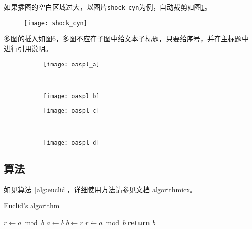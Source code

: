 如果插图的空白区域过大，以图片\verb|shock_cyn|为例，自动裁剪如图\ref{fig:shock_cyn}。
\begin{figure}[!htbp]
    \centering
    \texttt{[image: shock\_cyn]}
    \label{fig:shock_cyn}
\end{figure}

多图的插入如图\ref{fig:oaspl}，多图不应在子图中给文本子标题，只要给序号，并在主标题中进行引用说明。
\begin{figure}[!htbp]
    \centering
    \begin{subfigure}[b]{0.35\textwidth}
      \texttt{[image: oaspl\_a]}
      \caption{}
      \label{fig:oaspl_a}
    \end{subfigure}%
    ~%
    \begin{subfigure}[b]{0.35\textwidth}
      \texttt{[image: oaspl\_b]}
      \caption{}
      \label{fig:oaspl_b}
    \end{subfigure}
    \begin{subfigure}[b]{0.35\textwidth}
      \texttt{[image: oaspl\_c]}
      \caption{}
      \label{fig:oaspl_c}
    \end{subfigure}%
    ~%
    \begin{subfigure}[b]{0.35\textwidth}
      \texttt{[image: oaspl\_d]}
      \caption{}
      \label{fig:oaspl_d}
    \end{subfigure}
    \label{fig:oaspl}
\end{figure}

\subsection{算法}

如见算法~\ref{alg:euclid}，详细使用方法请参见文档 \href{https://ctan.org/pkg/algorithmicx?lang=en}{algorithmicx}。

\begin{algorithm}[!htbp]
    \small
    \caption{Euclid's algorithm}\label{alg:euclid}
    \begin{algorithmic}[1]
        \State $r\gets a\bmod b$
        \State $a\gets b$
        \State $b\gets r$
        \State $r\gets a\bmod b$
        \EndWhile\label{euclidendwhile}
        \State \textbf{return} $b$
        \EndProcedure
    \end{algorithmic}
\end{algorithm}

